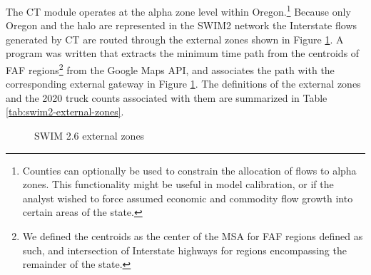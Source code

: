 The CT module operates at the alpha zone level within Oregon.\footnote{Counties can optionally be used to constrain the allocation of flows to alpha zones. This functionality might be useful in model calibration, or if the analyst wished to force assumed economic and commodity flow growth into certain areas of the state.} Because only Oregon and the halo are represented in the SWIM2 network the Interstate flows generated by CT are routed through the external zones shown in Figure \ref{fig:swim2-external-zones}. A program was written that extracts the minimum time path from the centroids of FAF regions\footnote{We defined the centroids as the center of the MSA for FAF regions defined as such, and intersection of Interstate highways for regions encompassing the remainder of the state.} from the Google Maps API, and associates the path with the corresponding external gateway in Figure \ref{fig:swim2-external-zones}. The definitions of the external zones and the 2020 truck counts associated with them are summarized in Table \ref{tab:swim2-external-zones}.

\begin{figure}[!t]
\centering
{}
\caption{SWIM 2.6 external zones}
\label{fig:swim2-external-zones}
\end{figure}

